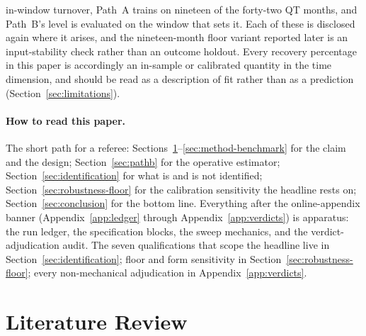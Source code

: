\documentclass[12pt]{article}
\begin{document}
in-window turnover, Path~A trains on nineteen of the forty-two QT months, and Path~B's level is evaluated on the window that sets it. Each of these is disclosed again where it arises, and the nineteen-month floor variant reported later is an input-stability check rather than an outcome holdout. Every recovery percentage in this paper is accordingly an in-sample or calibrated quantity in the time dimension, and should be read as a description of fit rather than as a prediction (Section~\ref{sec:limitations}).

\paragraph{How to read this paper.} The short path for a referee: Sections~\ref{sec:lit}--\ref{sec:method-benchmark} for the claim and the design; Section~\ref{sec:pathb} for the operative estimator; Section~\ref{sec:identification} for what is and is not identified; Section~\ref{sec:robustness-floor} for the calibration sensitivity the headline rests on; Section~\ref{sec:conclusion} for the bottom line. Everything after the online-appendix banner (Appendix~\ref{app:ledger} through Appendix~\ref{app:verdicts}) is apparatus: the run ledger, the specification blocks, the sweep mechanics, and the verdict-adjudication audit. The seven qualifications that scope the headline live in Section~\ref{sec:identification}; floor and form sensitivity in Section~\ref{sec:robustness-floor}; every non-mechanical adjudication in Appendix~\ref{app:verdicts}.

\section{Literature Review}\label{sec:lit}
\end{document}
